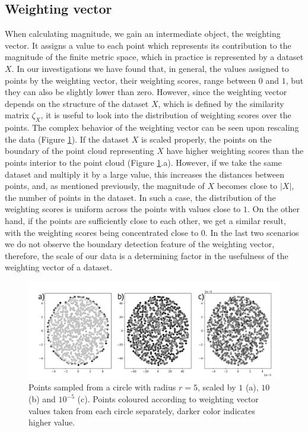 \documentclass{article}
\begin{document}
\subsection{Weighting vector}

When calculating magnitude, we gain an intermediate object, the weighting vector. It assigns a value to each point which represents its contribution to the magnitude of the finite metric space, which in practice is represented by a dataset $X$. In our investigations we have found that, in general, the values assigned to points by the weighting vector, their weighting scores, range between $0$ and $1$, but they can also be slightly lower than zero. However,  since the weighting vector depends on the structure of the dataset $X$, which is defined by the similarity matrix $\zeta_{X}$, it is useful to look into the distribution of weighting scores over the points. The complex behavior of the weighting vector can be seen upon rescaling the data (Figure \ref{fig:diff_scales}). If the dataset $X$ is scaled properly, the points on the boundary of the point cloud representing $X$ have higher weighting scores than the points interior to the point cloud (Figure \ref{fig:diff_scales}.a). However, if we take the same dataset and multiply it by a large value, this increases the distances between points, and, as mentioned previously, the magnitude of $X$ becomes close to $|X|$, the number of points in the dataset. In such a case, the distribution of the weighting scores is uniform across the points with values close to $1$. On the other hand, if the points are sufficiently close to each other, we get a similar result, with the weighting scores being concentrated close to $0$. In the last two scenarios we do not observe the boundary detection feature of the weighting vector, therefore, the scale of our data is a determining factor in the usefulness of the weighting vector of a dataset.

\begin{figure}
  \includegraphics[width=\linewidth]{../figures/1_different_scales/plot_wlabels.png}
  \caption{Points sampled from a circle with radius $r=5$, scaled by $1$ (a), $10$ (b) and $10^{-5}$ (c). Points coloured according to weighting vector values taken from each circle separately, darker color indicates higher value.}
  \label{fig:diff_scales}
\end{figure}
\end{document}

